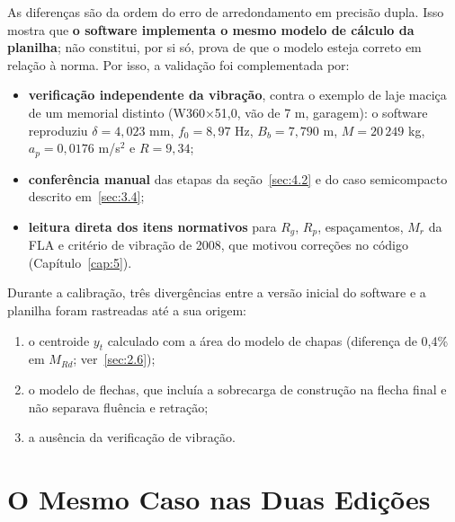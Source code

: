 \vspace{-\baselineskip}

As diferenças são da ordem do erro de arredondamento em precisão dupla. Isso mostra que \textbf{o software implementa o mesmo modelo de cálculo da planilha}; não constitui, por si só, prova de que o modelo esteja correto em relação à norma. Por isso, a validação foi complementada por:
\begin{itemize}
\item \textbf{verificação independente da vibração}, contra o exemplo de laje maciça de um memorial distinto (W360\ensuremath{\times}51,0, vão de 7 m, garagem): o software reproduziu $\delta = 4{,}023$ mm, $f_0 = 8{,}97$ Hz, $B_b = 7{,}790$ m, $M = 20\,249$ kg, $a_p = 0{,}0176$ m/s\ensuremath{^2} e $R = 9{,}34$;
\item \textbf{conferência manual} das etapas da seção~\ref{sec:4.2} e do caso semicompacto descrito em~\ref{sec:3.4};
\item \textbf{leitura direta dos itens normativos} para $R_g$, $R_p$, espaçamentos, $M_r$ da FLA e critério de vibração de 2008, que motivou correções no código (Capítulo~\ref{cap:5}).
\end{itemize}

Durante a calibração, três divergências entre a versão inicial do software e a planilha foram rastreadas até a sua origem:
\begin{enumerate}
\item o centroide $y_t$ calculado com a área do modelo de chapas (diferença de 0,4\% em $M_{Rd}$; ver~\ref{sec:2.6});
\item o modelo de flechas, que incluía a sobrecarga de construção na flecha final e não separava fluência e retração;
\item a ausência da verificação de vibração.
\end{enumerate}

\section{O Mesmo Caso nas Duas Edições}\label{sec:4.4}


